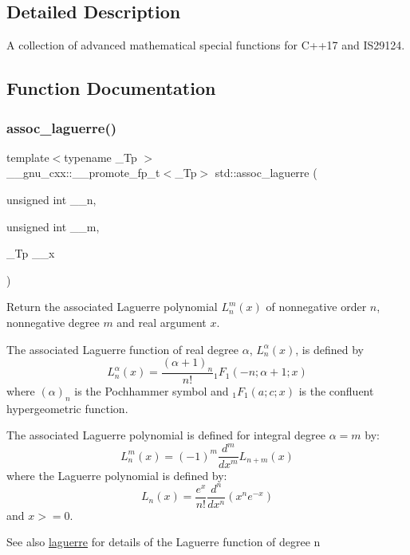 \subsection{Detailed Description}
A collection of advanced mathematical special functions for C++17 and I\+S29124. 

\subsection{Function Documentation}
\mbox{\label{group__tr29124__math__spec__func_ga87158c36cc84c104a3b23582829d8831}} 
\subsubsection{\texorpdfstring{assoc\+\_\+laguerre()}{assoc\_laguerre()}}
{\footnotesize\ttfamily template$<$typename \+\_\+\+Tp $>$ \\
\+\_\+\+\_\+gnu\+\_\+cxx\+::\+\_\+\+\_\+promote\+\_\+fp\+\_\+t$<$\+\_\+\+Tp$>$ std\+::assoc\+\_\+laguerre (\begin{DoxyParamCaption}\item[{unsigned int}]{\+\_\+\+\_\+n,  }\item[{unsigned int}]{\+\_\+\+\_\+m,  }\item[{\+\_\+\+Tp}]{\+\_\+\+\_\+x }\end{DoxyParamCaption})\hspace{0.3cm}{\ttfamily [inline]}}

Return the associated Laguerre polynomial $ L_n^m(x) $ of nonnegative order $ n $, nonnegative degree $ m $ and real argument $ x $.

The associated Laguerre function of real degree $ \alpha $, $ L_n^\alpha(x) $, is defined by \[ L_n^\alpha(x) = \frac{(\alpha + 1)_n}{n!} {}_1F_1(-n; \alpha + 1; x) \] where $ (\alpha)_n $ is the Pochhammer symbol and $ {}_1F_1(a; c; x) $ is the confluent hypergeometric function.

The associated Laguerre polynomial is defined for integral degree $ \alpha = m $ by\+: \[ L_n^m(x) = (-1)^m \frac{d^m}{dx^m} L_{n + m}(x) \] where the Laguerre polynomial is defined by\+: \[ L_n(x) = \frac{e^x}{n!} \frac{d^n}{dx^n} (x^ne^{-x}) \] and $ x >= 0 $. \begin{DoxySeeAlso}{See also}
\hyperlink{group__tr29124__math__spec__func_gaf1927ca6432351e3a7af47e158e63862}{laguerre} for details of the Laguerre function of degree {\ttfamily n} 
\end{DoxySeeAlso}

